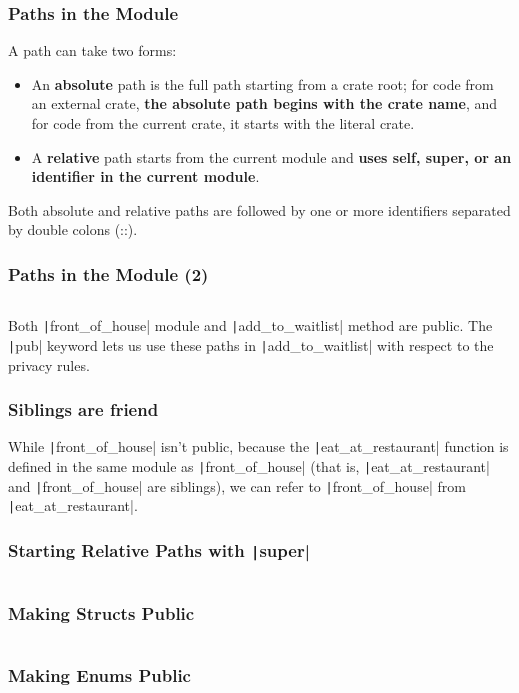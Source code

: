 \documentclass{beamer}
\begin{document}
\begin{frame}[fragile]
	\frametitle{Paths in the Module}
	A path can take two forms:
	
	\begin{itemize}
		\item 	An \textbf{absolute} path is the full path starting from a crate root; for code from an external crate, \textbf{the absolute path begins with the crate name}, and for code from the current crate, it starts with the literal crate.
		\item 	A \textbf{relative} path starts from the current module and \textbf{uses self, super, or an identifier in the current module}.
	\end{itemize}
	Both absolute and relative paths are followed by one or more identifiers separated by double colons (::).
\end{frame}


\begin{frame}[fragile]
	\frametitle{Paths in the Module (2)}
	
	\inputminted{rust}{./code/module.rs}
	
	Both \texttt|front_of_house| module and \texttt|add_to_waitlist|  method are public. The \texttt|pub| keyword lets us use these paths in \texttt|add_to_waitlist| with respect to the privacy rules.
\end{frame}

\begin{frame}[fragile]
	\frametitle{Siblings are friend}
	While \texttt|front_of_house| isn’t public, because the \texttt|eat_at_restaurant| function is defined in the same module as \texttt|front_of_house| (that is, \texttt|eat_at_restaurant| and \texttt|front_of_house| are siblings), we can refer to \texttt|front_of_house|  from \texttt|eat_at_restaurant|. 
\end{frame}


\begin{frame}[fragile]
	\frametitle{Starting Relative Paths with \texttt|super| }
	\inputminted{rust}{./code/module2.rs}
\end{frame}

\begin{frame}[fragile]
	\frametitle{Making Structs Public}
	\inputminted[fontsize=\fontsize{8pt}{8pt}]{rust}{./code/module3.rs}
\end{frame}

\begin{frame}[fragile]
	\frametitle{Making Enums Public}
	\inputminted{rust}{./code/module4.rs}
\end{frame}
\end{document}
